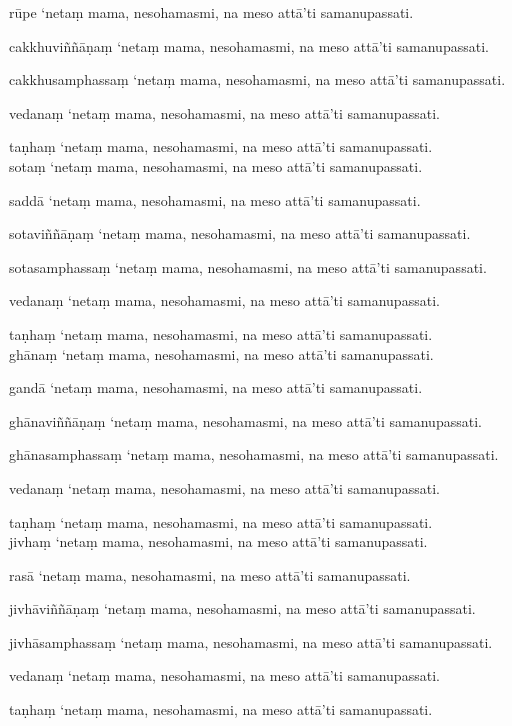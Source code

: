 \documentclass[11pt]{article}
\begin{document}
rūpe ‘netaṃ mama, nesohamasmi, na meso attā’ti samanupassati.\

cakkhuviññāṇaṃ ‘netaṃ mama, nesohamasmi, na meso attā’ti samanupassati.\

cakkhusamphassaṃ ‘netaṃ mama, nesohamasmi, na meso attā’ti samanupassati.\

vedanaṃ ‘netaṃ mama, nesohamasmi, na meso attā’ti samanupassati.\

taṇhaṃ ‘netaṃ mama, nesohamasmi, na meso attā’ti samanupassati.\\

sotaṃ ‘netaṃ mama, nesohamasmi, na meso attā’ti samanupassati.\

saddā ‘netaṃ mama, nesohamasmi, na meso attā’ti samanupassati.\

sotaviññāṇaṃ ‘netaṃ mama, nesohamasmi, na meso attā’ti samanupassati.\

sotasamphassaṃ ‘netaṃ mama, nesohamasmi, na meso attā’ti samanupassati.\

vedanaṃ ‘netaṃ mama, nesohamasmi, na meso attā’ti samanupassati.\

taṇhaṃ ‘netaṃ mama, nesohamasmi, na meso attā’ti samanupassati.\\

ghānaṃ ‘netaṃ mama, nesohamasmi, na meso attā’ti samanupassati.\

gandā ‘netaṃ mama, nesohamasmi, na meso attā’ti samanupassati.\

ghānaviññāṇaṃ ‘netaṃ mama, nesohamasmi, na meso attā’ti samanupassati.\

ghānasamphassaṃ ‘netaṃ mama, nesohamasmi, na meso attā’ti samanupassati.\

vedanaṃ ‘netaṃ mama, nesohamasmi, na meso attā’ti samanupassati.\

taṇhaṃ ‘netaṃ mama, nesohamasmi, na meso attā’ti samanupassati.\\

jivhaṃ ‘netaṃ mama, nesohamasmi, na meso attā’ti samanupassati.\

rasā ‘netaṃ mama, nesohamasmi, na meso attā’ti samanupassati.\

jivhāviññāṇaṃ ‘netaṃ mama, nesohamasmi, na meso attā’ti samanupassati.\

jivhāsamphassaṃ ‘netaṃ mama, nesohamasmi, na meso attā’ti samanupassati.\

vedanaṃ ‘netaṃ mama, nesohamasmi, na meso attā’ti samanupassati.\

taṇhaṃ ‘netaṃ mama, nesohamasmi, na meso attā’ti samanupassati.\\
\end{document}
